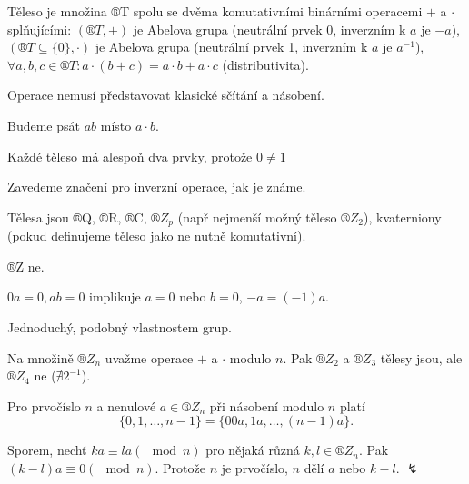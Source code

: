 \documentclass[12pt]{article}					%
\begin{document}
        \begin{definice}[Těleso]
                Těleso je množina ®T spolu se dvěma komutativními binárními operacemi $+$ a $·$ splňujícími: $(®T, +)$ je Abelova grupa (neutrální prvek 0, inverzním k $a$ je $-a$), $(®T \subseteq \{0\}, ·)$ je Abelova grupa (neutrální prvek 1, inverzním k $a$ je $a^{-1}$), $\forall a, b, c \in ®T: a·(b + c) = a·b + a·c$ (distributivita).
        \end{definice}

        \begin{poznamka}
            Operace nemusí představovat klasické sčítání a násobení.

            Budeme psát $ab$ místo $a·b$.

            Každé těleso má alespoň dva prvky, protože $0 ≠ 1$

            Zavedeme značení pro inverzní operace, jak je známe.
        \end{poznamka}

        \begin{priklady}
            Tělesa jsou ®Q, ®R, ®C, $®Z_p$ (např nejmenší možný těleso $®Z_2$), kvaterniony (pokud definujeme těleso jako ne nutně komutativní).

            ®Z ne.
        \end{priklady}

        \begin{tvrzeni}
            $0a = 0, ab = 0$ implikuje $a = 0$ nebo $b = 0$, $-a = (-1)a$.

            \begin{dukazin}
                Jednoduchý, podobný vlastnostem grup.
            \end{dukazin}
        \end{tvrzeni}


        \begin{poznamka}
            Na množině $®Z_n$ uvažme operace $+$ a $·$ modulo $n$. Pak $®Z_2$ a $®Z_3$ tělesy jsou, ale $®Z_4$ ne ($\nexists 2^{-1}$).
        \end{poznamka}

        \begin{lemma}
            Pro prvočíslo $n$ a nenulové $a \in ®Z_n$ při násobení modulo $n$ platí
            $$ \{0, 1, …, n-1\} = \{00a, 1a, …, (n-1)a\}. $$

            \begin{dukazin}
                Sporem, nechť $ka≡la (\mod n)$ pro nějaká různá $k, l \in ®Z_n$. Pak $(k-l)a≡0 (\mod n)$. Protože $n$ je prvočíslo, $n$ dělí $a$ nebo $k-l$. $\lightning$
            \end{dukazin}
        \end{lemma}
\end{document}
